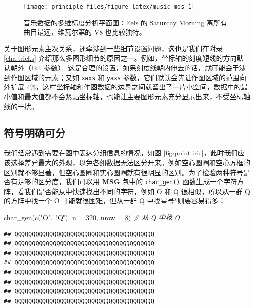 \documentclass[
  b5paper,
  UTF8,twoside]{book}
\newenvironment{Shaded}{\begin{snugshade}}{\end{snugshade}}
\newcommand{\AttributeTok}[1]{\textcolor[rgb]{0.77,0.63,0.00}{#1}}
\newcommand{\CommentTok}[1]{\textcolor[rgb]{0.56,0.35,0.01}{\textit{#1}}}
\newcommand{\DecValTok}[1]{\textcolor[rgb]{0.00,0.00,0.81}{#1}}
\newcommand{\FunctionTok}[1]{\textcolor[rgb]{0.00,0.00,0.00}{#1}}
\newcommand{\NormalTok}[1]{#1}
\newcommand{\StringTok}[1]{\textcolor[rgb]{0.31,0.60,0.02}{#1}}
\begin{document}
\begin{figure}

{\centering \texttt{[image: principle\_files/figure-latex/music-mds-1]} 

}

\caption[ 音乐数据的多维标度分析平面图 ]{音乐数据的多维标度分析平面图：Eels 的 Saturday Morning 离所有曲目最远，维瓦尔第的 V8 也比较独特。}\label{fig:music-mds}
\end{figure}



关于图形元素主次关系，还牵涉到一些细节设置问题，这也是我们在附录 \ref{cha:tricks} 介绍那么多图形细节的原因之一。例如，坐标轴的刻度短线的方向默认朝外（\texttt{tcl} 参数），这是合理的设置，如果刻度线朝内伸去的话，就可能会干涉到作图区域的元素；又如 \texttt{xaxs} 和 \texttt{yaxs} 参数，它们默认会先让作图区域的范围向外扩展 4\%，这样坐标轴和作图数据的边界之间就留出了一片小空间，数据中的最小值和最大值都不会紧贴坐标轴，也能让主要图形元素充分显示出来，不受坐标轴线的干扰。

\hypertarget{subsec:clear-symbols}{%
\subsection{符号明确可分}\label{subsec:clear-symbols}}

我们经常遇到需要在图中表达分组信息的情况，如图 \ref{fig:point-iris}，此时我们应该选择差异最大的外观，以免各组数据无法区分开来。例如空心圆圈和空心方框的区别就不够显著，但空心圆圈和实心圆圈就有很明显的区别。为了检验两种符号是否有足够的区分度，我们可以用 \textbf{MSG} 包中的 \texttt{char\_gen()} 函数生成一个字符方阵，看我们是否能从中快速找出不同的字符，例如 O 和 Q 很相似，所以从一群 Q 的方阵中找一个 O 可能就很困难，但从一群 Q 中找星号*则要容易得多：

\begin{Shaded}
\begin{Highlighting}[]
\FunctionTok{char\_gen}\NormalTok{(}\FunctionTok{c}\NormalTok{(}\StringTok{"O"}\NormalTok{, }\StringTok{"Q"}\NormalTok{), }\AttributeTok{n =} \DecValTok{320}\NormalTok{, }\AttributeTok{nrow =} \DecValTok{8}\NormalTok{) }\CommentTok{\# 从 Q 中找 O}
\end{Highlighting}
\end{Shaded}

\begin{verbatim}
## QQQQQQQQQQQQQQQQQQQQQQQQQQQQQQQQQQQQQQQQ
## QQQQQQQQQQQQQQQQQQQQQQQQQQQQQQQQQQQQQQQQ
## QQQQQQQQQQQQQQQQQQQQQQQQQQQQQQQQQQQQQQQQ
## QQQQQQQQQQQQQQQQQQOQQQQQQQQQQQQQQQQQQQQQ
## QQQQQQQQQQQQQQQQQQQQQQQQQQQQQQQQQQQQQQQQ
## QQQQQQQQQQQQQQQQQQQQQQQQQQQQQQQQQQQQQQQQ
## QQQQQQQQQQQQQQQQQQQQQQQQQQQQQQQQQQQQQQQQ
## QQQQQQQQQQQQQQQQQQQQQQQQQQQQQQQQQQQQQQQQ
\end{verbatim}
\end{document}
